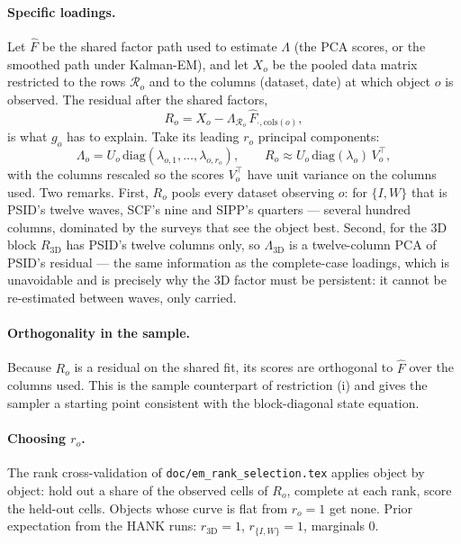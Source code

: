 \documentclass[11pt]{article}
\newcommand{\code}[1]{\texttt{#1}}
\begin{document}
\paragraph{Specific loadings.} Let $\hat F$ be the shared factor path used to
estimate $\Lambda$ (the PCA scores, or the smoothed path under Kalman-EM), and
let $X_o$ be the pooled data matrix restricted to the rows $\mathcal{R}_o$ and to
the columns (dataset, date) at which object $o$ is observed. The residual after
the shared factors,
\begin{equation}
  R_o = X_o - \Lambda_{\mathcal{R}_o}\,\hat F_{\cdot,\mathrm{cols}(o)},
\end{equation}
is what $g_o$ has to explain. Take its leading $r_o$ principal components:
\begin{equation}
  \Lambda_o = U_o\,\mathrm{diag}(\lambda_{o,1},\ldots,\lambda_{o,r_o}),
  \qquad R_o \approx U_o\,\mathrm{diag}(\lambda_o)\,V_o^{\top},
\end{equation}
with the columns rescaled so the scores $V_o^{\top}$ have unit variance on the
columns used. Two remarks. First, $R_o$ pools every dataset observing $o$: for
$\{I,W\}$ that is PSID's twelve waves, SCF's nine and SIPP's quarters ---
several hundred columns, dominated by the surveys that see the object best.
Second, for the 3D block $R_{\mathrm{3D}}$ has PSID's twelve columns only, so
$\Lambda_{\mathrm{3D}}$ is a twelve-column PCA of PSID's residual --- the same
information as the complete-case loadings, which is unavoidable and is
precisely why the 3D factor must be persistent: it cannot be re-estimated
between waves, only carried.

\paragraph{Orthogonality in the sample.} Because $R_o$ is a residual on the
shared fit, its scores are orthogonal to $\hat F$ over the columns used. This is
the sample counterpart of restriction (i) and gives the sampler a starting
point consistent with the block-diagonal state equation.

\paragraph{Choosing $r_o$.} The rank cross-validation of
\code{doc/em\_rank\_selection.tex} applies object by object: hold out a share
of the observed cells of $R_o$, complete at each rank, score the held-out
cells. Objects whose curve is flat from $r_o = 1$ get none. Prior expectation
from the HANK runs: $r_{\mathrm{3D}} = 1$, $r_{\{I,W\}} = 1$, marginals $0$.
\end{document}
